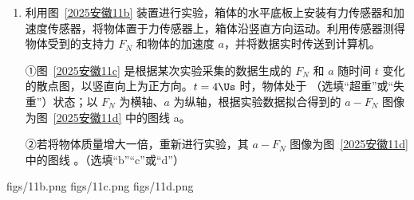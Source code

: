 \documentclass[\gkver]{gaokaozhenti}
\begin{document}
\begin{enumerate}
\begin{enumerate}
b．受牵引时，能拖动纸带沿轨道做匀速运动

c．不受牵引时，能拖动纸带沿轨道做匀速运动
\item
利用图~\ref{2025安徽11b} 装置进行实验，箱体的水平底板上安装有力传感器和加速度传感器，将物体置于力传感器上，箱体沿竖直方向运动。利用传感器测得物体受到的支持力 $F_{N}$ 和物体的加速度 $a$，并将数据实时传送到计算机。

①图~\ref{2025安徽11c} 是根据某次实验采集的数据生成的 $F_{N}$ 和 $a$ 随时间 $t$ 变化的散点图，以竖直向上为正方向。$t = 4 \Us$ 时，物体处于 （选填“超重”或“失重”）状态；以 $F_{N}$ 为横轴、$a$ 为纵轴，根据实验数据拟合得到的 $a-F_{N}$ 图像为图~\ref{2025安徽11d} 中的图线 a。

②若将物体质量增大一倍，重新进行实验，其 $a-F_{N}$ 图像为图~\ref{2025安徽11d} 中的图线 。（选填“b”“c”或“d”）
\end{enumerate}

{figs/11b.png}
{figs/11c.png}
{figs/11d.png}



\end{enumerate}
\end{document}
